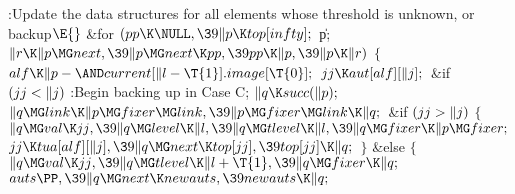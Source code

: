 \B{}:Update the data structures for all elements whose
threshold is unknown, or backup\X${}\E{}$\6
\&{for} ${}(\\{pp}\K\NULL,\39\|p\K\\{top}[\\{infty}];{}$ \|p; ${}\|r\K\|p\MG%
\\{next},\39\|p\MG\\{next}\K\\{pp},\39\\{pp}\K\|p,\39\|p\K\|r){}$\5
${}\{{}$\1\6
${}\\{alf}\K\|p-{\AND}\\{current}[\|l-\T{1}].\\{image}[\T{0}];{}$\6
${}\\{jj}\K\\{aut}[\\{alf}][\|j];{}$\6
\&{if} ${}(\\{jj}<\|j){}$\1\5
:Begin backing up in Case C\X;\2\6
${}\|q\K\\{succ}(\|p);{}$\6
${}\|q\MG\\{link}\K\|p\MG\\{fixer}\MG\\{link},\39\|p\MG\\{fixer}\MG\\{link}\K%
\|q;{}$\6
\&{if} ${}(\\{jj}>\|j){}$\5
${}\{{}$\1\6
${}\|q\MG\\{val}\K\\{jj},\39\|q\MG\\{level}\K\|l,\39\|q\MG\\{tlevel}\K\|l,\39%
\|q\MG\\{fixer}\K\|p\MG\\{fixer};{}$\6
${}\\{jj}\K\\{tua}[\\{alf}][\|j],\39\|q\MG\\{next}\K\\{top}[\\{jj}],\39\\{top}[%
\\{jj}]\K\|q;{}$\6
\4${}\}{}$\5
\2\&{else}\5
${}\{{}$\1\6
${}\|q\MG\\{val}\K\\{jj},\39\|q\MG\\{tlevel}\K\|l+\T{1},\39\|q\MG\\{fixer}\K%
\|q;{}$\6
${}\\{auts}\PP,\39\|q\MG\\{next}\K\\{newauts},\39\\{newauts}\K\|q;{}$\6
